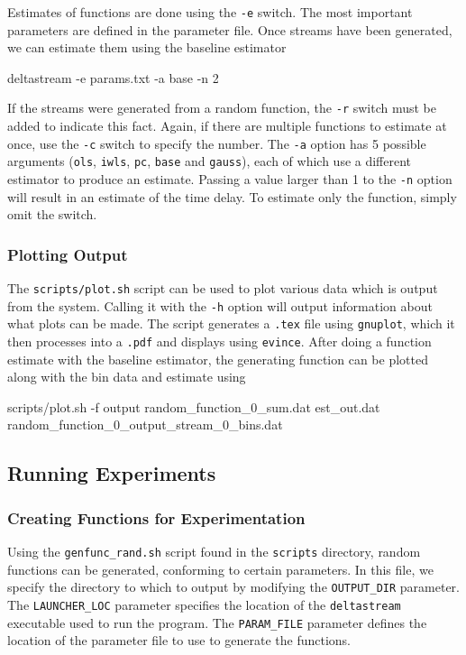 \documentclass[a4paper,11pt,twoside]{article}
\begin{document}
\begin{appendices}
    Estimates of functions are done using the \texttt{-e} switch. The most
    important parameters are defined in the parameter file. Once streams have
    been generated, we can estimate them using the baseline estimator
    \begin{verbatimtab}
    deltastream -e params.txt -a base -n 2
    \end{verbatimtab}
    If the streams were generated from a random function, the \texttt{-r} switch
    must be added to indicate this fact. Again, if there are multiple functions
    to estimate at once, use the \texttt{-c} switch to specify the number. The
    \texttt{-a} option has 5 possible arguments (\texttt{ols}, \texttt{iwls},
    \texttt{pc}, \texttt{base} and \texttt{gauss}), each of which use a
    different estimator to produce an estimate. Passing a value larger than 1 to
    the \texttt{-n} option will result in an estimate of the time delay. To
    estimate only the function, simply omit the switch.
\subsubsection{Plotting Output}
\label{sec-10-2-4}

    The \texttt{scripts/plot.sh} script can be used to plot various data which
    is output from the system. Calling it with the \texttt{-h} option will
    output information about what plots can be made. The script generates a
    \texttt{.tex} file using \texttt{gnuplot}, which it then processes into a
    \texttt{.pdf} and displays using \texttt{evince}. After doing a function
    estimate with the baseline estimator, the generating function can be plotted
    along with the bin data and estimate using 
    \begin{verbatimtab}
    scripts/plot.sh -f output random_function_0_sum.dat est_out.dat
    random_function_0_output_stream_0_bins.dat
    \end{verbatimtab}
\subsection{Running Experiments}
\label{sec-10-3}
\subsubsection{Creating Functions for Experimentation}
\label{sec-10-3-1}

    Using the \texttt{genfunc\_rand.sh} script found in the \texttt{scripts} directory, random
    functions can be generated, conforming to certain parameters. In this file,
    we specify the directory to which to output by modifying the
    \texttt{OUTPUT\_DIR} parameter. The \texttt{LAUNCHER\_LOC} parameter specifies the
    location of the \texttt{deltastream} executable used to run the program. The
    \texttt{PARAM\_FILE} parameter defines the location of the parameter file to use
    to generate the functions.


\end{appendices}
\end{document}

